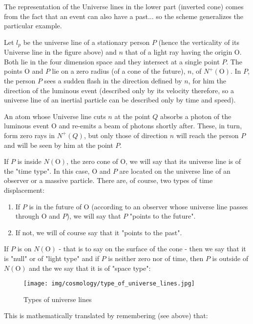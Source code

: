	\begin{tcolorbox}[title=Remark,colframe=black,arc=10pt]
	The representation of the Universe lines in the lower part (inverted cone) comes from the fact that an event can also have a past... so the scheme generalizes the particular example.
	\end{tcolorbox}	
	Let $l_p$ be the universe line of a stationary person $P$ (hence the verticality of its Universe line in the figure above) and $n$ that of a light ray having the origin O. Both lie in the four dimension space and they intersect at a single point $P$. The points O and $P$ lie on a zero radius (of a cone of the future), $n$, of $N^{+}(\text{O})$. In $P$, the person $P$ sees a sudden flash in the direction defined by $n$, for him the direction of the luminous event (described only by its velocity therefore, so a universe line of an inertial particle can be described only by time and speed).
	
	An atom whose Universe line cuts $n$ at the point $Q$ absorbs a photon of the luminous event O and re-emits a beam of photons shortly after. These, in turn, form zero rays in $N^{+}(Q)$, but only those of direction $n$ will reach the person $P$ and will be seen by him at the point $P$.

	If $P$ is inside $N(\text{O})$, the zero cone of O, we will say that its universe line is of the "time type". In this case, O and $P$ are located on the universe line of an observer or a massive particle. There are, of course, two types of time displacement:
	\begin{enumerate}
		\item If $P$ is in the future of O (according to an observer whose universe line passes through O and $P$), we will say that $P$ "points to the future".

		\item If not, we will of course say that it "points to the past".
	\end{enumerate}
	If $P$ is on $N(\text{O})$ - that is to say on the surface of the cone - then we say that it is "null" or of "light type" and if $P$ is neither zero nor of time, then $P$ is outside of $N(\text{O})$ and the we say that it is of "space type":
	\begin{figure}[H]
		\centering
		\texttt{[image: img/cosmology/type\_of\_universe\_lines.jpg]}
		\caption{Types of universe lines}	
	\end{figure}
	This is mathematically translated by remembering (see above) that:
	
